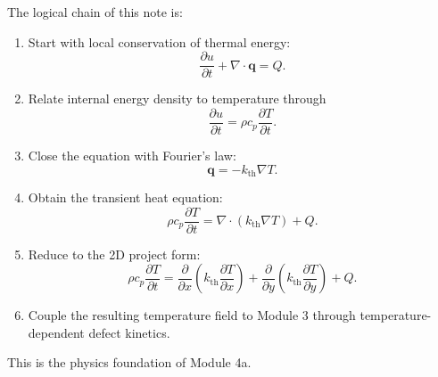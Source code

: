 \documentclass[11pt]{article}
\newcommand{\qvec}{\mathbf{q}}
\newcommand{\kth}{k_{\mathrm{th}}}
\begin{document}
The logical chain of this note is:
\begin{enumerate}[label=\arabic*.]
    \item Start with local conservation of thermal energy:
    \begin{equation}
    \frac{\partial u}{\partial t} + \nabla \cdot \qvec = Q.
\end{equation}
    \item Relate internal energy density to temperature through
    \begin{equation}
    \frac{\partial u}{\partial t} = \rho c_p \frac{\partial T}{\partial t}.
\end{equation}
    \item Close the equation with Fourier's law:
    \begin{equation}
    \qvec = -\kth \nabla T.
\end{equation}
    \item Obtain the transient heat equation:
    \begin{equation}
    \rho c_p \frac{\partial T}{\partial t} = \nabla \cdot (\kth \nabla T) + Q.
\end{equation}
    \item Reduce to the 2D project form:
    \begin{equation}
    \rho c_p \frac{\partial T}{\partial t}
    =
    \frac{\partial}{\partial x}\left(\kth \frac{\partial T}{\partial x}\right)
    +
    \frac{\partial}{\partial y}\left(\kth \frac{\partial T}{\partial y}\right)
    + Q.
\end{equation}
    \item Couple the resulting temperature field to Module 3 through temperature-dependent defect kinetics.
\end{enumerate}

This is the physics foundation of Module 4a.
\end{document}
